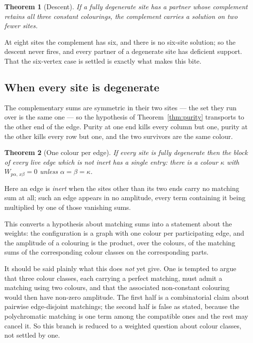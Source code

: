 \documentclass[11pt]{article}
\newtheorem{theorem}{Theorem}[section]
\theoremstyle{definition}
\theoremstyle{remark}
\begin{document}
\begin{theorem}[Descent]\label{thm:fandescent}
If a fully degenerate site has a partner whose complement retains all three constant
colourings, the complement carries a solution on two fewer sites.
\end{theorem}

At eight sites the complement has six, and there is no six-site solution; so the
descent never fires, and every partner of a degenerate site has deficient support. That
the six-vertex case is settled is exactly what makes this bite.

\subsection*{When every site is degenerate}

The complementary sums are symmetric in their two sites --- the set they run over is
the same one --- so the hypothesis of Theorem~\ref{thm:purity} transports to the other
end of the edge. Purity at one end kills every column but one, purity at the other
kills every row but one, and the two survivors are the same colour.

\begin{theorem}[One colour per edge]\label{thm:onecolour}
If every site is fully degenerate then the block of every live edge which is not inert
has a single entry: there is a colour $\kappa$ with $W_{p\alpha,\,x\beta} = 0$ unless
$\alpha = \beta = \kappa$.
\end{theorem}

Here an edge is \emph{inert} when the sites other than its two ends carry no matching
sum at all; such an edge appears in no amplitude, every term containing it being
multiplied by one of those vanishing sums.

This converts a hypothesis about matching sums into a statement about the weights: the
configuration is a graph with one colour per participating edge, and the amplitude of a
colouring is the product, over the colours, of the matching sums of the corresponding
colour classes on the corresponding parts.

It should be said plainly what this does \emph{not} yet give. One is tempted to argue
that three colour classes, each carrying a perfect matching, must admit a matching using
two colours, and that the associated non-constant colouring would then have non-zero
amplitude. The first half is a combinatorial claim about pairwise edge-disjoint
matchings; the second half is false as stated, because the polychromatic matching is one
term among the compatible ones and the rest may cancel it. So this branch is reduced to
a weighted question about colour classes, not settled by one.
\end{document}
